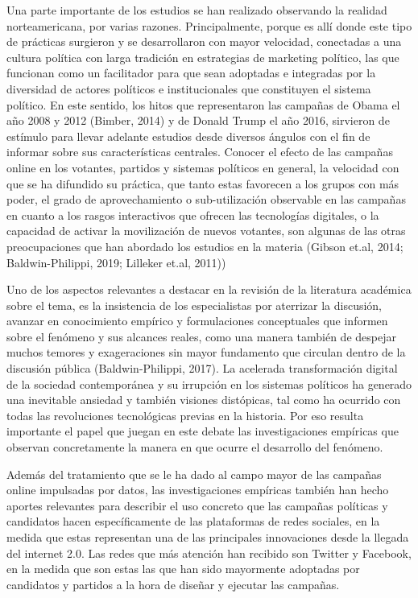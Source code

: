 \documentclass[
  10pt,
  letterpaper,
]{report}
\begin{document}
Una parte importante de los estudios se han realizado observando la
realidad norteamericana, por varias razones. Principalmente, porque es
allí donde este tipo de prácticas surgieron y se desarrollaron con mayor
velocidad, conectadas a una cultura política con larga tradición en
estrategias de marketing político, las que funcionan como un facilitador
para que sean adoptadas e integradas por la diversidad de actores
políticos e institucionales que constituyen el sistema político. En este
sentido, los hitos que representaron las campañas de Obama el año 2008 y
2012 (Bimber, 2014) y de Donald Trump el año 2016, sirvieron de estímulo
para llevar adelante estudios desde diversos ángulos con el fin de
informar sobre sus características centrales. Conocer el efecto de las
campañas online en los votantes, partidos y sistemas políticos en
general, la velocidad con que se ha difundido su práctica, que tanto
estas favorecen a los grupos con más poder, el grado de aprovechamiento
o sub-utilización observable en las campañas en cuanto a los rasgos
interactivos que ofrecen las tecnologías digitales, o la capacidad de
activar la movilización de nuevos votantes, son algunas de las otras
preocupaciones que han abordado los estudios en la materia (Gibson
et.al, 2014; Baldwin-Philippi, 2019; Lilleker et.al, 2011))

Uno de los aspectos relevantes a destacar en la revisión de la
literatura académica sobre el tema, es la insistencia de los
especialistas por aterrizar la discusión, avanzar en conocimiento
empírico y formulaciones conceptuales que informen sobre el fenómeno y
sus alcances reales, como una manera también de despejar muchos temores
y exageraciones sin mayor fundamento que circulan dentro de la discusión
pública (Baldwin-Philippi, 2017). La acelerada transformación digital de
la sociedad contemporánea y su irrupción en los sistemas políticos ha
generado una inevitable ansiedad y también visiones distópicas, tal como
ha ocurrido con todas las revoluciones tecnológicas previas en la
historia. Por eso resulta importante el papel que juegan en este debate
las investigaciones empíricas que observan concretamente la manera en
que ocurre el desarrollo del fenómeno.

Además del tratamiento que se le ha dado al campo mayor de las campañas
online impulsadas por datos, las investigaciones empíricas también han
hecho aportes relevantes para describir el uso concreto que las campañas
políticas y candidatos hacen específicamente de las plataformas de redes
sociales, en la medida que estas representan una de las principales
innovaciones desde la llegada del internet 2.0. Las redes que más
atención han recibido son Twitter y Facebook, en la medida que son estas
las que han sido mayormente adoptadas por candidatos y partidos a la
hora de diseñar y ejecutar las campañas.
\end{document}

